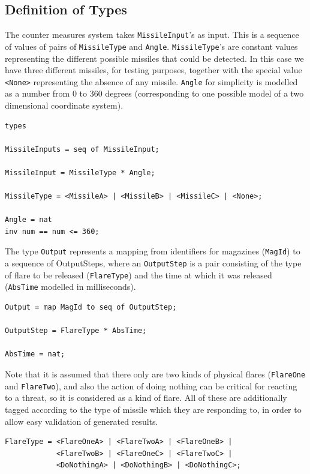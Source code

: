 \documentclass{overturerepchap}
\begin{document}
\subsection{Definition of Types}\label{subsec:generaltypes}

The counter measures system takes \texttt{MissileInput}'s as
input. This is a sequence of values of pairs of \texttt{MissileType} and
\texttt{Angle}. \texttt{MissileType}'s are
constant values representing the different possible missiles that
could be detected. In this case we have three different missiles, for
testing purposes, together with the special value \texttt{<None>}
representing the absence of any missile. \texttt{Angle} for simplicity 
is modelled as a number from 0 to 360 degrees (corresponding to one
possible model of a two 
dimensional coordinate system).

\begin{lstlisting}
types
  
MissileInputs = seq of MissileInput;

MissileInput = MissileType * Angle;

MissileType = <MissileA> | <MissileB> | <MissileC> | <None>;

Angle = nat
inv num == num <= 360;
\end{lstlisting}

The type \texttt{Output} represents a mapping from identifiers for 
magazines (\texttt{MagId}) to a sequence of OutputSteps, where
an \texttt{OutputStep} is a pair consisting of the type of flare to be
released (\texttt{FlareType}) and the time at which it was released
(\texttt{AbsTime} modelled in milliseconds).

\begin{lstlisting}
Output = map MagId to seq of OutputStep;

OutputStep = FlareType * AbsTime;

AbsTime = nat;
\end{lstlisting}

Note that it is assumed that there only are two kinds of physical flares
(\texttt{FlareOne} and \texttt{FlareTwo}), and also the action of
doing nothing can be critical for reacting to a threat, so it is
considered as a kind of flare. All of these are additionally tagged
according to the type of missile which they are responding to, in
order to allow easy validation of generated results.

\begin{lstlisting}
FlareType = <FlareOneA> | <FlareTwoA> | <FlareOneB> |
            <FlareTwoB> | <FlareOneC> | <FlareTwoC> |
            <DoNothingA> | <DoNothingB> | <DoNothingC>;
\end{lstlisting}
\end{document}
